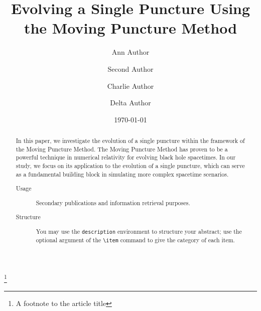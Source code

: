 \documentclass[%
 reprint,
 amsmath,amssymb,
 aps,
 prd,
]{revtex4-2}
\begin{document}

\title{Evolving a Single Puncture Using the Moving Puncture Method}%
\thanks{A footnote to the article title}%

\author{Ann Author}
\author{Second Author}%
%


\author{Charlie Author}
%
%
\author{Delta Author}
%


\date{\today}%

\begin{abstract}
In this paper, we investigate the evolution of a single puncture within the framework of the Moving Puncture Method. The Moving Puncture Method has proven to be a powerful technique in numerical relativity for evolving black hole spacetimes. In our study, we focus on its application to the evolution of a single puncture, which can serve as a fundamental building block in simulating more complex spacetime scenarios.
\begin{description}
\item[Usage]
Secondary publications and information retrieval purposes.
\item[Structure]
You may use the \texttt{description} environment to structure your abstract;
use the optional argument of the \verb+\item+ command to give the category of each item. 
\end{description}
\end{abstract}
\end{document}
